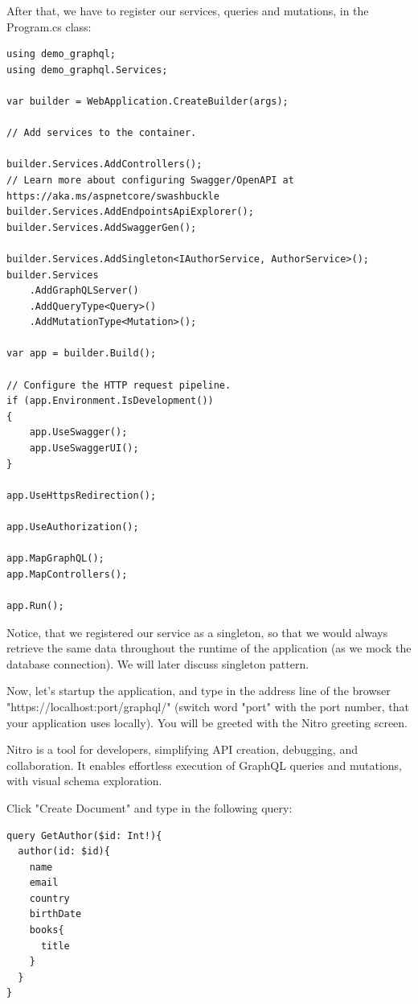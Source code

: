 After that, we have to register our services, queries and mutations, in the Program.cs class:

\begin{lstlisting}
using demo_graphql;
using demo_graphql.Services;

var builder = WebApplication.CreateBuilder(args);

// Add services to the container.

builder.Services.AddControllers();
// Learn more about configuring Swagger/OpenAPI at https://aka.ms/aspnetcore/swashbuckle
builder.Services.AddEndpointsApiExplorer();
builder.Services.AddSwaggerGen();

builder.Services.AddSingleton<IAuthorService, AuthorService>();
builder.Services
    .AddGraphQLServer()
    .AddQueryType<Query>()
    .AddMutationType<Mutation>();

var app = builder.Build();

// Configure the HTTP request pipeline.
if (app.Environment.IsDevelopment())
{
    app.UseSwagger();
    app.UseSwaggerUI();
}

app.UseHttpsRedirection();

app.UseAuthorization();

app.MapGraphQL();
app.MapControllers();

app.Run();

\end{lstlisting}

Notice, that we registered our service as a singleton, so that we would always retrieve the same data throughout the runtime of the application (as we mock the database connection). We will later discuss singleton pattern.

Now, let's startup the application, and type in the address line of the browser "https://localhost:port/graphql/" (switch word "port" with the port number, that your application uses locally). You will be greeted with the Nitro greeting screen.

Nitro is a tool for developers, simplifying API creation, debugging, and collaboration. It enables effortless execution of GraphQL queries and mutations, with visual schema exploration.

Click "Create Document" and type in the following query:

\begin{lstlisting}
query GetAuthor($id: Int!){
  author(id: $id){
    name
    email
    country
    birthDate
    books{
      title
    }
  }
}
\end{lstlisting}

